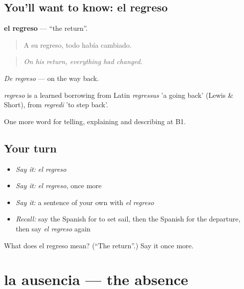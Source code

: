 \subsection*{You'll want to know: el regreso}
\textbf{el regreso} — \textquotedblleft{}the return\textquotedblright{}.

\begin{quote}
A su regreso, todo había cambiado.
\end{quote}

\begin{quote}
\emph{On his return, everything had changed.}
\end{quote}

\emph{De regreso} — on the way back.

\begin{cousinweb}
\emph{regreso} is a learned borrowing from Latin \emph{regressus} 'a going back' (Lewis \& Short), from \emph{regredī} 'to step back'.
\end{cousinweb}

\begin{grammarlens}[title={What you've built}]
One more word for telling, explaining and describing at B1.
\end{grammarlens}

\subsection*{Your turn}
\begin{itemize}
\raggedright
  \item \emph{Say it:} \emph{el regreso}
  \item \emph{Say it:} \emph{el regreso}, once more
  \item \emph{Say it:} a sentence of your own with \emph{el regreso}
  \item \emph{Recall:} say the Spanish for to set sail, then the Spanish for the departure, then say \emph{el regreso} again
\end{itemize}

\begin{tcolorbox}[breakable,colback=teal!4,colframe=teal!35!black,title={Before you move on}]
What does el regreso mean? (\textquotedblleft{}The return\textquotedblright{}.) Say it once more.
\end{tcolorbox}
\section[la ausencia]{la ausencia — the absence}

